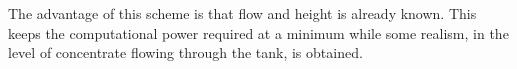 The advantage of this scheme is that flow and height is already known. This keeps the computational power required at a minimum while some realism, in the level of concentrate flowing through the tank, is obtained.






